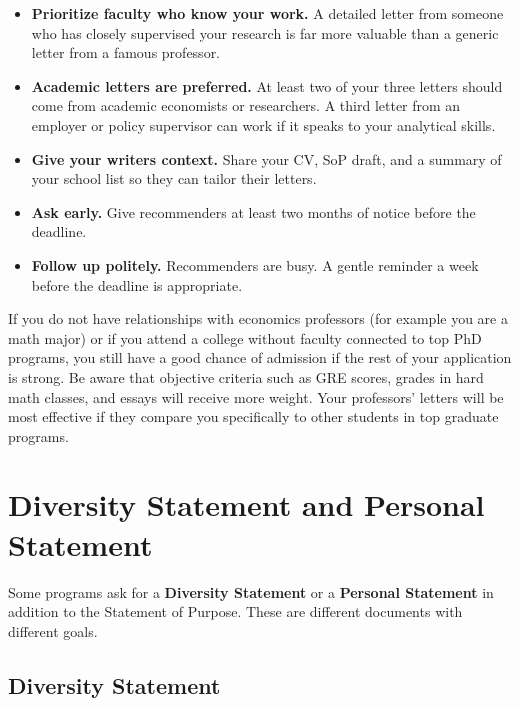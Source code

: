 \documentclass[11pt, letterpaper]{article}
\begin{document}
\begin{itemize}[leftmargin=*, itemsep=2pt]
    \item \textbf{Prioritize faculty who know your work.} A detailed letter from someone who has closely supervised your research is far more valuable than a generic letter from a famous professor.
    \item \textbf{Academic letters are preferred.} At least two of your three letters should come from academic economists or researchers. A third letter from an employer or policy supervisor can work if it speaks to your analytical skills.
    \item \textbf{Give your writers context.} Share your CV, SoP draft, and a summary of your school list so they can tailor their letters.
    \item \textbf{Ask early.} Give recommenders at least two months of notice before the deadline.
    \item \textbf{Follow up politely.} Recommenders are busy. A gentle reminder a week before the deadline is appropriate.
\end{itemize}

\begin{tipbox}
If you do not have relationships with economics professors (for example you are a math major) or if you attend a college without faculty connected to top PhD programs, you still have a good chance of admission if the rest of your application is strong. Be aware that objective criteria such as GRE scores, grades in hard math classes, and essays will receive more weight. Your professors' letters will be most effective if they compare you specifically to other students in top graduate programs.
\end{tipbox}


\section{Diversity Statement and Personal Statement}\label{sec:diversity}

Some programs ask for a \textbf{Diversity Statement} or a \textbf{Personal Statement} in addition to the Statement of Purpose. These are different documents with different goals.

\subsection{Diversity Statement}
\end{document}
